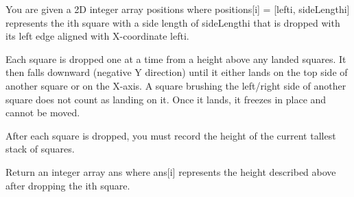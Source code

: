 \documentclass[9pt, b5paaper]{book}
\begin{document}
You are given a 2D integer array positions where positions[i] = [lefti, sideLengthi] represents the ith square with a side length of sideLengthi that is dropped with its left edge aligned with X-coordinate lefti.

Each square is dropped one at a time from a height above any landed squares. It then falls downward (negative Y direction) until it either lands on the top side of another square or on the X-axis. A square brushing the left/right side of another square does not count as landing on it. Once it lands, it freezes in place and cannot be moved.

After each square is dropped, you must record the height of the current tallest stack of squares.

Return an integer array ans where ans[i] represents the height described above after dropping the ith square.
\end{document}
